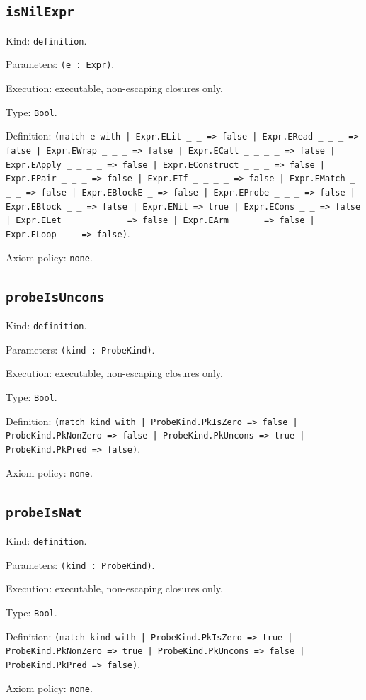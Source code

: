 \documentclass[11pt]{article}
\begin{document}
\subsection*{\texttt{isNilExpr}}
\noindent Kind: \texttt{definition}.\par
\noindent Parameters: \texttt{(e : Expr)}.\par
\noindent Execution: executable, non-escaping closures only.\par
\noindent Type: \texttt{Bool}.\par
\noindent Definition: \texttt{(match e with | Expr.ELit \_ \_ => false | Expr.ERead \_ \_ \_ => false | Expr.EWrap \_ \_ \_ => false | Expr.ECall \_ \_ \_ \_ => false | Expr.EApply \_ \_ \_ \_ => false | Expr.EConstruct \_ \_ \_ => false | Expr.EPair \_ \_ \_ => false | Expr.EIf \_ \_ \_ \_ => false | Expr.EMatch \_ \_ \_ => false | Expr.EBlockE \_ => false | Expr.EProbe \_ \_ \_ => false | Expr.EBlock \_ \_ => false | Expr.ENil => true | Expr.ECons \_ \_ => false | Expr.ELet \_ \_ \_ \_ \_ \_ => false | Expr.EArm \_ \_ \_ => false | Expr.ELoop \_ \_ => false)}.\par
\noindent Axiom policy: \texttt{none}.\par
\subsection*{\texttt{probeIsUncons}}
\noindent Kind: \texttt{definition}.\par
\noindent Parameters: \texttt{(kind : ProbeKind)}.\par
\noindent Execution: executable, non-escaping closures only.\par
\noindent Type: \texttt{Bool}.\par
\noindent Definition: \texttt{(match kind with | ProbeKind.PkIsZero => false | ProbeKind.PkNonZero => false | ProbeKind.PkUncons => true | ProbeKind.PkPred => false)}.\par
\noindent Axiom policy: \texttt{none}.\par
\subsection*{\texttt{probeIsNat}}
\noindent Kind: \texttt{definition}.\par
\noindent Parameters: \texttt{(kind : ProbeKind)}.\par
\noindent Execution: executable, non-escaping closures only.\par
\noindent Type: \texttt{Bool}.\par
\noindent Definition: \texttt{(match kind with | ProbeKind.PkIsZero => true | ProbeKind.PkNonZero => true | ProbeKind.PkUncons => false | ProbeKind.PkPred => false)}.\par
\noindent Axiom policy: \texttt{none}.\par
\end{document}
